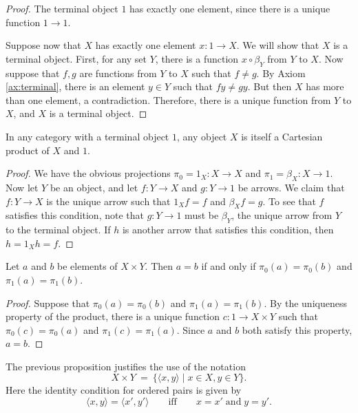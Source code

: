 \begin{proof} The terminal object $1$ has exactly one element, since
  there is a unique function $1\to 1$.

  Suppose now that $X$ has exactly one element $x:1\to X$.  We will
  show that $X$ is a terminal object.  First, for any set $Y$, there
  is a function $x\circ \beta _Y$ from $Y$ to $X$.  Now suppose that
  $f,g$ are functions from $Y$ to $X$ such that $f\neq g$.  By Axiom
  \ref{ax:terminal}, there is an element $y\in Y$ such that $fy\neq
  gy$.  But then $X$ has more than one element, a contradiction.
  Therefore, there is a unique function from $Y$ to $X$, and $X$ is a
  terminal object.  \end{proof}

\begin{prop} In any category with a terminal object $1$, any object
  $X$ is itself a Cartesian product of $X$ and $1$.  \end{prop}

\begin{proof} We have the obvious projections $\pi _0=1_X:X\to X$ and
  $\pi _1=\beta _X:X\to 1$.  Now let $Y$ be an object, and let
  $f:Y\to X$ and $g:Y\to 1$ be arrows.  We claim that $f:Y\to X$ is
  the unique arrow such that $1_Xf=f$ and $\beta _Xf=g$.  To see that
  $f$ satisfies this condition, note that $g:Y\to 1$ must be
  $\beta _Y$, the unique arrow from $Y$ to the terminal object.  If
  $h$ is another arrow that satisfies this condition, then
  $h=1_Xh=f$. \end{proof}

\begin{prop} Let $a$ and $b$ be elements of $X\times Y$.  Then $a=b$
  if and only if $\pi _0(a)=\pi _0(b)$ and $\pi _1(a)=\pi
  _1(b)$. \end{prop}

\begin{proof} Suppose that $\pi _0(a)=\pi _0(b)$ and $\pi _1(a)=\pi
  _1(b)$.  By the uniqueness property of the product, there is a
  unique function $c:1\to X\times Y$ such that $\pi _0(c)=\pi _0(a)$
  and $\pi _1(c)=\pi _1(a)$.  Since $a$ and $b$ both satisfy this
  property, $a=b$.
\end{proof}

\begin{note} The previous proposition justifies the use of the
  notation
  \[ X\times Y \: = \: \{ \langle x,y\rangle \mid x\in X,y\in Y \} .\]
  Here the identity condition for ordered pairs is given by
  \[ \langle x,y\rangle = \langle x',y'\rangle \qquad \text{iff}
  \qquad x=x'\;\text{and}\; y=y' .\] \end{note}

